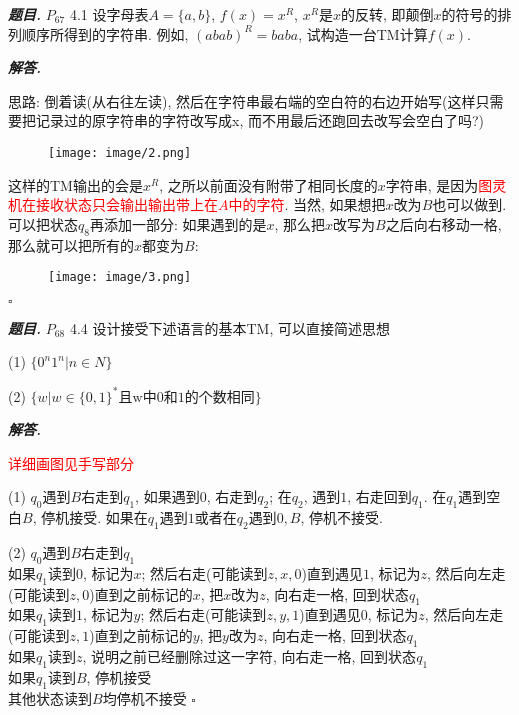 \documentclass[10pt, a4paper, oneside]{ctexart}
\newenvironment{problem}{\begin{framed}\par\noindent\textbf{\textit{题目. }}}{\end{framed}\par}
\newenvironment{solution}{%
  \par\noindent\textbf{\textit{解答. }}\ignorespaces
}{%
  \hfill\ensuremath{\square}\par
}
\begin{document}
\begin{problem}
$P_{67}$ 4.1 设字母表$A=\{a,b\}$, $f(x)=x^R$, $x^R$是$x$的反转, 即颠倒$x$的符号的排列顺序所得到的字符串. 例如, $(abab)^R=baba$, 试构造一台TM计算$f(x)$.
\end{problem}
\begin{solution}
思路: 倒着读(从右往左读), 然后在字符串最右端的空白符的右边开始写(这样只需要把记录过的原字符串的字符改写成x, 而不用最后还跑回去改写会空白了吗?)
\begin{figure}[h]
    \centering
    \texttt{[image: image/2.png]}
\end{figure}
这样的TM输出的会是$x^R$, 之所以前面没有附带了相同长度的$x$字符串, 是因为\textcolor{red}{图灵机在接收状态只会输出输出带上在$A$中的字符}.
当然, 如果想把$x$改为$B$也可以做到. 可以把状态$q_8$再添加一部分: 如果遇到的是$x$, 那么把$x$改写为$B$之后向右移动一格, 那么就可以把所有的$x$都变为$B$:
\begin{figure}[h]
    \centering
    \texttt{[image: image/3.png]}
\end{figure}
\end{solution}

\begin{problem}
$P_{68}$ 4.4 设计接受下述语言的基本TM, 可以直接简述思想

(1) $\{0^n1^n|n\in N\}$

(2) $\{w|w\in \{0,1\}^* \text{且w中0和1的个数相同}\}$
\end{problem}
\begin{solution}
\textcolor{red}{详细画图见手写部分}

(1) $q_0$遇到$B$右走到$q_1$, 如果遇到$0$, 右走到$q_2$; 在$q_2$, 遇到$1$, 右走回到$q_1$. 在$q_1$遇到空白$B$, 停机接受. 如果在$q_1$遇到$1$或者在$q_2$遇到$0,B$, 停机不接受. 

(2) $q_0$遇到$B$右走到$q_1$\\
如果$q_1$读到$0$, 标记为$x$; 然后右走(可能读到$z,x,0$)直到遇见$1$, 标记为$z$, 然后向左走(可能读到$z,0$)直到之前标记的$x$, 把$x$改为$z$, 向右走一格, 回到状态$q_1$\\
如果$q_1$读到$1$, 标记为$y$; 然后右走(可能读到$z,y,1$)直到遇见$0$, 标记为$z$, 然后向左走(可能读到$z,1$)直到之前标记的$y$, 把$y$改为$z$, 向右走一格, 回到状态$q_1$\\
如果$q_1$读到$z$, 说明之前已经删除过这一字符, 向右走一格, 回到状态$q_1$\\
如果$q_1$读到$B$, 停机接受\\
其他状态读到$B$均停机不接受
\end{solution}
\end{document}
